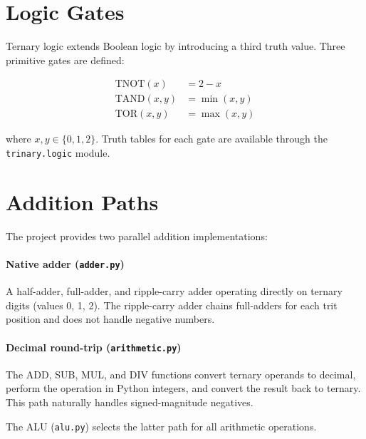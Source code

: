 \documentclass[11pt,a4paper]{article}
\begin{document}
\section{Logic Gates}
\label{sec:gates}

Ternary logic extends Boolean logic by introducing a third truth value.  Three
primitive gates are defined:

\begin{align*}
  \text{TNOT}(x) &= 2 - x \\
  \text{TAND}(x, y) &= \min(x, y) \\
  \text{TOR}(x, y) &= \max(x, y)
\end{align*}

where $x, y \in \{0, 1, 2\}$.  Truth tables for each gate are available
through the \texttt{trinary.logic} module.

\section{Addition Paths}
\label{sec:addition}

The project provides two parallel addition implementations:

\paragraph{Native adder (\texttt{adder.py})}
A half-adder, full-adder, and ripple-carry adder operating directly on ternary
digits (values 0, 1, 2).  The ripple-carry adder chains full-adders for each
trit position and does not handle negative numbers.

\paragraph{Decimal round-trip (\texttt{arithmetic.py})}
The ADD, SUB, MUL, and DIV functions convert ternary operands to decimal,
perform the operation in Python integers, and convert the result back to
ternary.  This path naturally handles signed-magnitude negatives.

The ALU (\texttt{alu.py}) selects the latter path for all arithmetic
operations.

\end{document}
